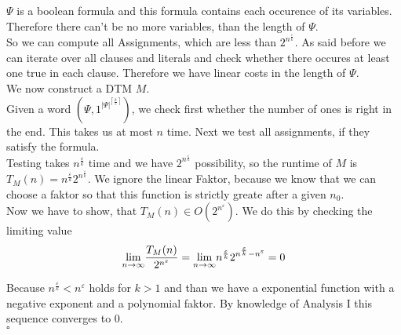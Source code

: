 $\Psi$ is a boolean formula and this formula contains each occurence of its variables. Therefore there can't
be no more variables, than the length of $\Psi$.\\
So we can compute all Assignments, which are less than $2^{n^{\frac{\varepsilon}{k}}}$.
As said before we can iterate over all clauses and literals and check whether there occures at least one 
true in each clause. Therefore we have linear costs in the length of $\Psi$.\\

We now construct a DTM $M$.\\
Given a word $(\Psi, 1^{|\Psi|^{\left\lceil \frac{k}{\varepsilon} \right\rceil }})$, we check first
whether the number of ones is right in the end. This takes us at most $n$ time.
Next we test all assignments, if they satisfy the formula.\\

Testing takes $n^\frac{\varepsilon}{k}$ time and we have $2^{n^\frac{\varepsilon}{k}}$ possibility, so
the runtime of $M$ is $T_M (n) = n^\frac{\varepsilon}{k} 2^{n^\frac{\varepsilon}{k}}$. We ignore the
linear Faktor, because we know that we can choose a faktor so that this function is strictly greate after a given $n_0$.\\

Now we have to show, that $T_M(n) \in O(2^{n^\varepsilon})$. We do this by checking the limiting value
$$
    \underset{n \rightarrow \infty}{\lim} \frac{T_M (n)}{2^{n^\varepsilon}}
        = \underset{n \rightarrow \infty}{\lim} n^\frac{\varepsilon}{k} 2^{n^\frac{\varepsilon}{k} - n^\varepsilon}\\
        = 0
$$

Because $n^\frac{\varepsilon}{k} < n^\varepsilon$ holds for $k > 1$ and than we have a exponential function with a negative exponent
and a polynomial faktor. By knowledge of Analysis I this sequence converges to 0.\\
\mbox{} \hfill $\square$
